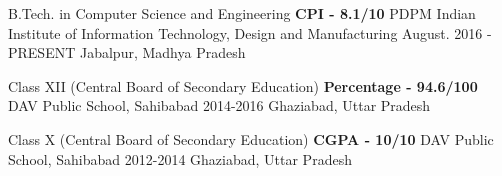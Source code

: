 \begin{cventries}
  \cventry
    {\small B.Tech. in Computer Science and Engineering \textbf{CPI - 8.1/10}}
    {PDPM Indian Institute of Information Technology, Design and Manufacturing}
    {August. 2016 - PRESENT}
    {Jabalpur, Madhya Pradesh}
    {}
\end{cventries}

\begin{cventries}
  \cventry
    {\small Class XII (Central Board of Secondary Education) \textbf{Percentage - 94.6/100}}
    {DAV Public School, Sahibabad}
    {2014-2016}
    {Ghaziabad, Uttar Pradesh}
    {}
\end{cventries}

\begin{cventries}
  \cventry
    {\small Class X (Central Board of Secondary Education) \textbf{CGPA - 10/10}}
    {DAV Public School, Sahibabad}
    {2012-2014}
    {Ghaziabad, Uttar Pradesh}
    {
    }
\end{cventries}